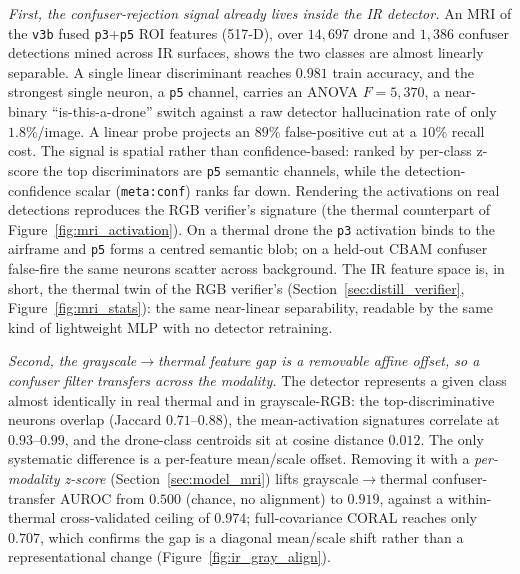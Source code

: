 \emph{First, the confuser-rejection signal already lives inside the IR detector.} An MRI of the \texttt{v3b} fused \texttt{p3}+\texttt{p5} ROI features (517-D), over $14{,}697$ drone and $1{,}386$ confuser detections mined across IR surfaces, shows the two classes are almost linearly separable. A single linear discriminant reaches $0.981$ train accuracy, and the strongest single neuron, a \texttt{p5} channel, carries an ANOVA $F=5{,}370$, a near-binary ``is-this-a-drone'' switch against a raw detector hallucination rate of only $1.8\%$/image. A linear probe projects an $89\%$ false-positive cut at a $10\%$ recall cost. The signal is spatial rather than confidence-based: ranked by per-class z-score the top discriminators are \texttt{p5} semantic channels, while the detection-confidence scalar (\texttt{meta:conf}) ranks far down. Rendering the activations on real detections reproduces the RGB verifier's signature (the thermal counterpart of Figure~\ref{fig:mri_activation}). On a thermal drone the \texttt{p3} activation binds to the airframe and \texttt{p5} forms a centred semantic blob; on a held-out CBAM confuser false-fire the same neurons scatter across background. The IR feature space is, in short, the thermal twin of the RGB verifier's (Section~\ref{sec:distill_verifier}, Figure~\ref{fig:mri_stats}): the same near-linear separability, readable by the same kind of lightweight MLP with no detector retraining.

\emph{Second, the grayscale$\rightarrow$thermal feature gap is a removable affine offset, so a confuser filter transfers across the modality.} The detector represents a given class almost identically in real thermal and in grayscale-RGB: the top-discriminative neurons overlap (Jaccard $0.71$--$0.88$), the mean-activation signatures correlate at $0.93$--$0.99$, and the drone-class centroids sit at cosine distance $0.012$. The only systematic difference is a per-feature mean/scale offset. Removing it with a \emph{per-modality z-score} (Section~\ref{sec:model_mri}) lifts grayscale$\rightarrow$thermal confuser-transfer AUROC from $0.500$ (chance, no alignment) to $0.919$, against a within-thermal cross-validated ceiling of $0.974$; full-covariance CORAL reaches only $0.707$, which confirms the gap is a diagonal mean/scale shift rather than a representational change (Figure~\ref{fig:ir_gray_align}).

